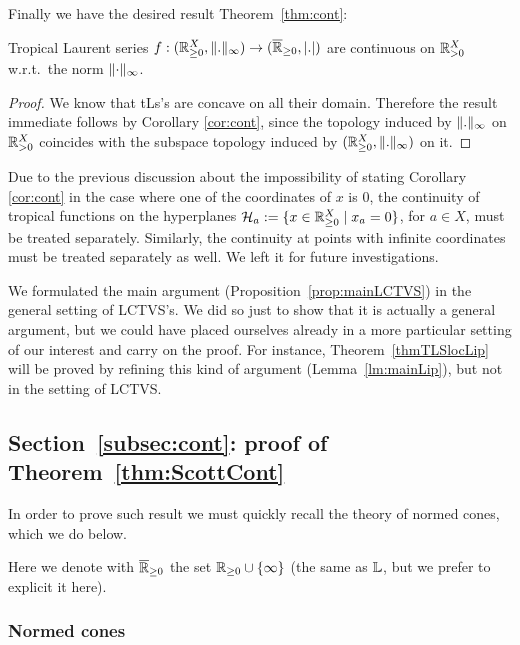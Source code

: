 Finally we have the desired result Theorem~\ref{thm:cont}:

\begin{theorem}
 Tropical Laurent series $f:({\mathbb{R}}_{\geq 0}^X,\lVert.\rVert_\infty) \to (\overline{\mathbb{R}}_{\geq 0},\left\lvert.\right\rvert)$ are continuous on ${\mathbb{R}}_{> 0}^X$ w.r.t.\ the norm $\lVert\cdot\rVert_\infty$.
\end{theorem}
\begin{proof}
 We know that tLs's are concave on all their domain.
 Therefore the result immediate follows by Corollary \ref{cor:cont}, since the topology induced by $\lVert.\rVert_\infty$ on ${\mathbb{R}}_{> 0}^X$ coincides with the subspace topology induced by $({\mathbb{R}}_{\geq 0}^X,\lVert.\rVert_\infty)$ on it.
\end{proof}

Due to the previous discussion about the impossibility of stating Corollary \ref{cor:cont} in the case where one of the coordinates of $x$ is $0$, the continuity of tropical functions on the hyperplanes $\mathcal H_a:=\{x\in {\mathbb{R}}_{\geq 0}^X \mid x_a=0\}$, for $a\in X$, must be treated separately.
Similarly, the continuity at points with infinite coordinates must be treated separately as well.
We left it for future investigations.

\begin{remark}
 We formulated the main argument (Proposition~\ref{prop:mainLCTVS}) in the general setting of LCTVS's.
We did so just to show that it is actually a general argument, but we could have placed ourselves already in a more particular setting of our interest and carry on the proof.
For instance, Theorem~\ref{thmTLSlocLip} will be proved by refining this kind of argument (Lemma~\ref{lm:mainLip}), but not in the setting of LCTVS.
\end{remark} 



\subsection{Section~\ref{subsec:cont}: proof of Theorem~\ref{thm:ScottCont}}

In order to prove such result we must quickly recall the theory of normed cones, which we do below.

Here we denote with $\overline{\mathbb{R}}_{\geq 0}$ the set $\mathbb{R}_{\geq 0}\cup\{\infty\}$ (the same as $\mathbb{L}$, but we prefer to explicit it here).

\subsubsection{Normed cones}

